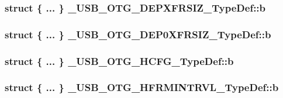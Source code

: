 \hypertarget{group___u_s_b___o_t_g___d_r_i_v_e_r_ga786d5ef260b91be9f48665384921db3e}{
\subsubsection[{b}]{\setlength{\rightskip}{0pt plus 5cm}struct \{ ... \} 
   \-\_\-\-U\-S\-B\-\_\-\-O\-T\-G\-\_\-\-D\-E\-P\-X\-F\-R\-S\-I\-Z\-\_\-\-Type\-Def\-::b}}\label{group___u_s_b___o_t_g___d_r_i_v_e_r_ga786d5ef260b91be9f48665384921db3e}
\hypertarget{group___u_s_b___o_t_g___d_r_i_v_e_r_ga8b05bc8e548328734af4179f180c5b07}{
\subsubsection[{b}]{\setlength{\rightskip}{0pt plus 5cm}struct \{ ... \} 
   \-\_\-\-U\-S\-B\-\_\-\-O\-T\-G\-\_\-\-D\-E\-P0\-X\-F\-R\-S\-I\-Z\-\_\-\-Type\-Def\-::b}}\label{group___u_s_b___o_t_g___d_r_i_v_e_r_ga8b05bc8e548328734af4179f180c5b07}
\hypertarget{group___u_s_b___o_t_g___d_r_i_v_e_r_ga420c63f8a9ec0774dee5fb987abf3375}{
\subsubsection[{b}]{\setlength{\rightskip}{0pt plus 5cm}struct \{ ... \} 
   \-\_\-\-U\-S\-B\-\_\-\-O\-T\-G\-\_\-\-H\-C\-F\-G\-\_\-\-Type\-Def\-::b}}\label{group___u_s_b___o_t_g___d_r_i_v_e_r_ga420c63f8a9ec0774dee5fb987abf3375}
\hypertarget{group___u_s_b___o_t_g___d_r_i_v_e_r_ga718ffaa7de28efab5036c4b914725c50}{
\subsubsection[{b}]{\setlength{\rightskip}{0pt plus 5cm}struct \{ ... \} 
   \-\_\-\-U\-S\-B\-\_\-\-O\-T\-G\-\_\-\-H\-F\-R\-M\-I\-N\-T\-R\-V\-L\-\_\-\-Type\-Def\-::b}}\label{group___u_s_b___o_t_g___d_r_i_v_e_r_ga718ffaa7de28efab5036c4b914725c50}
